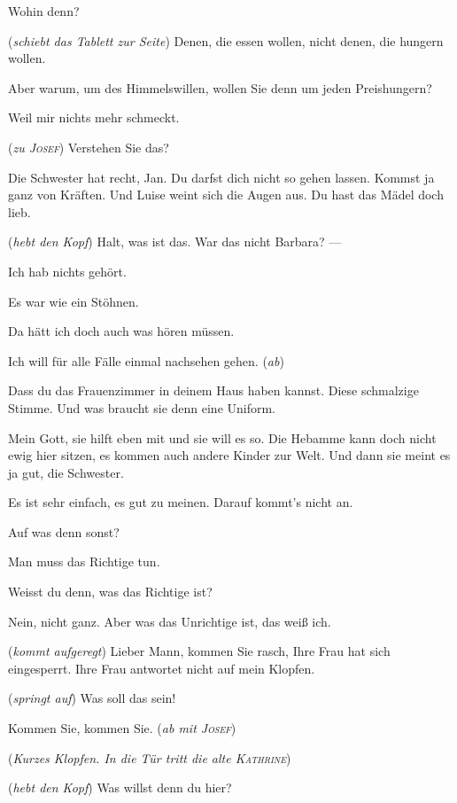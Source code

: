 \documentclass[
	final,
	a4paper,
	ngerman,
	mpinclude = true, %
	twoside = true,
	open = right,
	cleardoublepage = plain,
	DIV = 13,
	BCOR = 1cm,
	titlepage = firstiscover,
	]{scrbook}
\newcommand{\direction}[1]{(\textit{#1})}
\newcommand{\thecharacter}[1]{\textup{\textsc{#1}}\xspace}
\newcommand{\theJosef}{\thecharacter{Josef}}
\newcommand{\theKathrine}{\thecharacter{Kathrine}}
\newcommand{\theJan}{\thecharacter{Jan}}
\newcommand{\character}[1]{\item[#1]}
\newcommand{\Josef}{\character{\theJosef}}
\newcommand{\Jan}{\character{\theJan}}
\newcommand{\Heilsarmeeschwester}{\character{Schwester}}
\begin{document}
\begin{play}
\Heilsarmeeschwester
Wohin denn?

\Jan
\direction{schiebt das Tablett zur Seite} Denen, die essen wollen, nicht denen, die hungern wollen.

\Heilsarmeeschwester
Aber warum, um des Himmelswillen, wollen Sie denn um jeden Preishungern?

\Jan
Weil mir nichts mehr schmeckt.

\Heilsarmeeschwester
\direction{zu \theJosef} Verstehen Sie das?

\Josef
Die Schwester hat recht, Jan. Du darfst dich nicht so gehen lassen. Kommst ja ganz von Kräften. Und Luise weint sich die Augen aus. Du hast das Mädel doch lieb.

\Jan
\direction{hebt den Kopf} Halt, was ist das. War das nicht Barbara? ---

\Josef
Ich hab nichts gehört.

\Jan
Es war wie ein Stöhnen.

\Josef
Da hätt ich doch auch was hören müssen.

\Heilsarmeeschwester
Ich will für alle Fälle einmal nachsehen gehen. \direction{ab}

\Jan
Dass du das Frauenzimmer in deinem Haus haben kannst. Diese schmalzige Stimme. Und was braucht sie denn eine Uniform.

\Josef
Mein Gott, sie hilft eben mit und sie will es so. Die Hebamme kann doch nicht ewig hier sitzen, es kommen auch andere Kinder zur Welt. Und dann sie meint es ja gut, die Schwester.

\Jan
Es ist sehr einfach, es gut zu meinen. Darauf kommt's nicht an.

\Josef
Auf was denn sonst?

\Jan
Man muss das Richtige tun.

\Josef
Weisst du denn, was das Richtige ist?

\Jan
Nein, nicht ganz. Aber was das Unrichtige ist, das weiß ich.

\Heilsarmeeschwester
\direction{kommt aufgeregt} Lieber Mann, kommen Sie rasch, Ihre Frau hat sich eingesperrt. Ihre Frau antwortet nicht auf mein Klopfen.

\Josef
\direction{springt auf} Was soll das sein!

\Heilsarmeeschwester
Kommen Sie, kommen Sie. \direction{ab mit \theJosef}

\direction{Kurzes Klopfen. In die Tür tritt die alte \theKathrine}

\Jan
\direction{hebt den Kopf} Was willst denn du hier?


\end{play}
\end{document}

